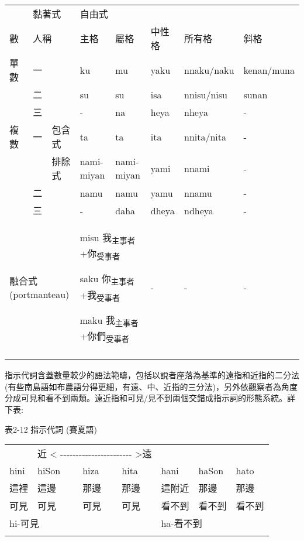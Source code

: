 \tabletail{}
\tablelasttail{}
\begin{tabularx}{\textwidth}{XXXXXXXX}
\lsptoprule

\multicolumn{3}{X}{ 人稱代名詞} & \multicolumn{2}{X}{ 黏著式} & \multicolumn{3}{X}{ 自由式}\\
\multicolumn{1}{X}{ 數} & \multicolumn{2}{X}{ 人稱} & 主格 & 屬格 & 中性格 & 所有格 & 斜格\\
\multicolumn{1}{X}{單數} & \multicolumn{2}{X}{一} & ku & mu & yaku & nnaku/naku & kenan/muna\\
& \multicolumn{2}{X}{二} & su & su & isa & nnisu/nisu & sunan\\
\hhline{~-------} & \multicolumn{2}{X}{三} & {}- & na & heya & nheya & {}-\\
\multicolumn{1}{X}{複數} & \multicolumn{1}{X}{一} & 包含式 & ta & ta & ita & nnita/nita & {}-\\
&  & 排除式 & nami-miyan & nami-miyan & yami & nnami & {}-\\
\hhline{~-------} & \multicolumn{2}{X}{二} & namu & namu & yamu & nnamu & {}-\\
\hhline{~-------} & \multicolumn{2}{X}{三} & {}- & daha & dheya & ndheya & {}-\\
\multicolumn{3}{X}{融合式 (portmanteau)} & \multicolumn{2}{X}{{\sffamily \textrm{misu 我}\textrm{\textsubscript{主事者}}\textrm{+你}\textrm{\textsubscript{受事者}}}

{\sffamily \textrm{saku 你}\textrm{\textsubscript{主事者}}\textrm{+我}\textrm{\textsubscript{受事者}}}

{\sffamily \textrm{maku 我}\textrm{\textsubscript{主事者}}\textrm{+你們}\textrm{\textsubscript{受事者}}}} & {}- & {}- & {}-\\
\lspbottomrule
\end{tabularx}
\textrm{指示代詞含蓋數量較少的語法範疇，包括以說者座落為基準的遠指和近指的二分法(有些南島語如布農語分得更細，有遠、中、近指的三分法)，另外依觀察者為角度分成可見和看不到兩類。遠近指和可見/見不到兩個交錯成指示詞的形態系統。詳下表:}

表2-12 指示代詞 (賽夏語)

\tablefirsthead{}

\tabletail{}
\tablelasttail{}
\begin{tabularx}{\textwidth}{XXXXXXX}
\lsptoprule

\multicolumn{4}{X}{近 < -{}-{}-{}-{}-{}-{}-{}-{}-{}-{}-{}-{}-{}-{}-{}-{}-{}-{}-{}-{}-{}-{}-{}-{}-{}-{}-{}-{}-{}-{}-{}-{}-{}-{}-{}- >遠} & \multicolumn{3}{X}{近 < -{}-{}-{}-{}-{}-{}-{}-{}-{}-{}-{}-{}-{}-{}-{}-{}-{}-{}-{}-{}-{}-{}- >遠}\\
hini & hiSon & hiza & hita & hani & haSon & hato\\
這裡 & 這邊 & 那邊 & 那邊 & 這附近 & 那邊 & 那邊\\
可見 & 可見 & 可見 & 可見 & 看不到 & 看不到 & 看不到\\
\multicolumn{4}{X}{hi-可見} & \multicolumn{3}{X}{ha-看不到}\\
\lspbottomrule
\end{tabularx}
